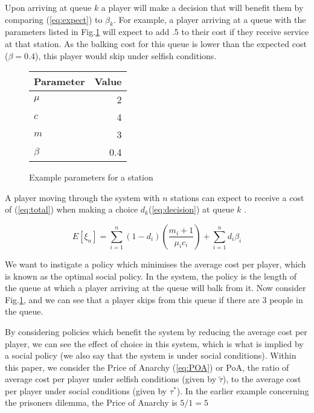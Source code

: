 \documentclass[12pt]{article}
\begin{document}
Upon arriving at queue $k$ a player will make a decision that will benefit them by comparing (\ref{eq:expect}) to $\beta_k$. For example, a player arriving at a queue with the parameters listed in Fig.\ref{fig:param} will expect to add .5 to their cost if they receive service at that station. As the balking cost for this queue is lower than the expected cost ($\beta=0.4$), this player would skip under selfish conditions.

\begin{figure}[ht]
  \begin{center}

    \begin{tabular}{ |l |r |}
                   			\hline
      Parameter  & Value \\ \hline
      $\mu$  & 2   		 \\ \hline
      $c$  & 4 			 \\ \hline
      $m$  & 3 			 \\ \hline
      $\beta$  & 0.4 	 \\ \hline
    \end{tabular}

    \caption{Example parameters for a station}
    \label{fig:param}
  \end{center}
\end{figure}

A player moving through the system with $n$ stations can expect to receive a cost of (\ref{eq:total}) when making a choice $d_k$(\ref{eq:decision}) at queue $k$ .




\begin{equation}\label{eq:total}
E[\xi_n] = \sum_{i=1}^{n}{(1-d_i)\left(\frac{m_i+1}{\mu_ic_i}\right)} + \sum_{i=1}^{n}{d_i\beta_i}
\end{equation}

We want to instigate a policy which minimises the average cost per player, which is known as the optimal social policy. In the system, the policy is the length of the queue at which a player arriving at the queue will balk from it. Now consider Fig.\ref{fig:param}, and we can see that a player skips from this queue if there are 3 people in the queue.

By considering policies which benefit the system by reducing the average cost per player, we can see the effect of choice in this system, which is what is implied by a social policy (we also say that the system is under social conditions). Within this paper, we consider the Price of Anarchy (\ref{eq:POA}) or PoA, the ratio of average cost per player under selfish conditions (given by $\tilde\tau$), to the average cost per player under social conditions (given by $\tau^*$). In the earlier example concerning the prisoners dilemma, the Price of Anarchy is $ 5/1 = 5$
\end{document}
